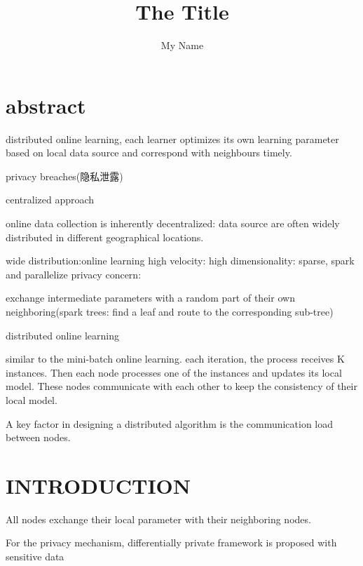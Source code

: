 \documentclass{article}
\author{My Name}
\title{The Title}
\begin{document}
	\section{abstract}
	distributed online learning,
	each learner optimizes its own learning parameter based on local data source and correspond with neighbours timely.
	
	privacy breaches(隐私泄露)
	
	centralized approach
	
	online data collection is inherently decentralized: data source are often widely distributed in different geographical locations.
	
	wide distribution:online learning
	high velocity:
	high dimensionality: sparse, spark and parallelize
	privacy concern: 
	
	exchange intermediate parameters with a random part of their own neighboring(spark trees: find a leaf and route to the corresponding sub-tree)
	
	distributed online learning
	
	similar to the mini-batch online learning. each iteration, the process receives K instances. Then each node processes one of the instances and updates its local model.
	These nodes communicate with each other to keep the consistency of their local model.
	
	A key factor in designing a distributed algorithm is the communication load between nodes.
	
	\section{INTRODUCTION}
	All nodes exchange their local parameter with their neighboring nodes.
	
	{\color{purple} For the privacy mechanism, differentially private framework is proposed with sensitive data}
	
	
	
	
	
	
	
	
	
\end{document}

